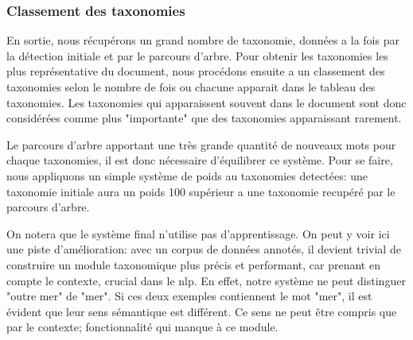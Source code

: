 \subsubsection{Classement des taxonomies}
En sortie, nous récupérons un grand nombre de taxonomie, données a la fois par la détection initiale et par le parcours d'arbre. Pour obtenir les taxonomies les plus représentative du document, nous procédons ensuite a un classement des taxonomies selon le nombre de fois ou chacune apparait dans le tableau des taxonomies. Les taxonomies qui apparaissent souvent dans le document sont donc considérées comme plus "importante" que des taxonomies apparaissant rarement.

Le parcours d'arbre apportant une très grande quantité de nouveaux mots pour chaque taxonomies, il est donc nécessaire d'équilibrer ce système. Pour se faire, nous appliquons un simple système de poids au taxonomies detectées: une taxonomie initiale aura un poids 100 supérieur a une taxonomie recupéré par le parcours d'arbre.

On notera que le système final n'utilise pas d'apprentissage.
On peut y voir ici une piste d'amélioration: avec un corpus de données annotés, il devient trivial de construire un module taxonomique plus précis et performant, car prenant en compte le contexte, crucial dans le \gls{nlp}.
En effet, notre système ne peut distinguer "outre mer" de "mer". Si ces deux exemples contiennent le mot "mer", il est évident que leur sens sémantique est différent. Ce sens ne peut être compris que par le contexte; fonctionnalité qui manque à ce module. 


